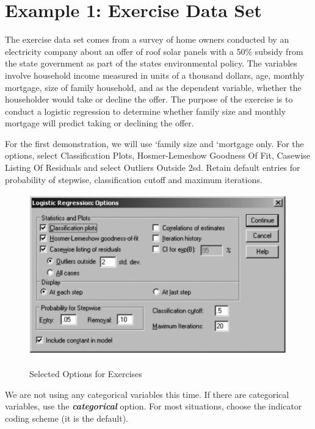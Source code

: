 \documentclass[a4paper,12pt]{article}
\begin{document}
	


\section*{Example 1: Exercise Data Set}
The exercise data set comes from a survey of home owners
conducted by an electricity company about an offer of roof solar panels with a 50\% subsidy
from the state government as part of the states environmental policy. The variables involve
household income measured in units of a thousand dollars, age, monthly mortgage, size of
family household, and as the dependent variable, whether the householder would take or decline the offer.
The purpose of the exercise is to conduct a logistic regression to determine whether family
size and monthly mortgage will predict taking or declining the offer.

For the first demonstration, we will use `family size and
`mortgage only. For the options, select Classification Plots, Hosmer-Lemeshow Goodness
Of Fit, Casewise Listing Of Residuals and select Outliers Outside 2sd. Retain default
entries for probability of stepwise, classification cutoff and maximum iterations.

\begin{figure}[h!]
\begin{center}
  \includegraphics[scale=0.8]{images/Logistic10}\\
  \caption{Selected Options for Exercises}
\end{center}
\end{figure}

We are not using any categorical variables this time. If there are categorical variables, use the \textbf{\textit{categorical}} option. For most situations, choose the indicator coding scheme (it is the
default).
\end{document}
